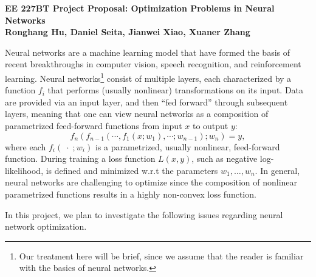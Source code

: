 \documentclass[10pt]{article}
\begin{document}
\parindent 0pt
\parskip 8pt

\begin{center}
\large\bf EE 227BT Project Proposal: Optimization Problems in Neural Networks \\
\large\bf \textnormal{Ronghang Hu, Daniel Seita, Jianwei Xiao, Xuaner Zhang} \\
\end{center}

Neural networks are a machine learning model that have formed the basis of recent breakthroughs in
computer vision, speech recognition, and reinforcement learning.  Neural networks\footnote{Our
treatment here will be brief, since we assume that the reader is familiar with the basics of neural
networks.} consist of multiple layers, each characterized by a function $f_i$ that performs (usually
nonlinear) transformations on its input. Data are provided via an input layer, and then ``fed
forward'' through subsequent layers, meaning that one can view neural networks as a composition of
parametrized feed-forward functions from input $x$ to output $y$:
\begin{equation}
f_n(f_{n-1}(\cdots, f_1(x; w_1), \cdots; w_{n-1}); w_n) = y,
\end{equation}
where each $f_i(\; \cdot \; ; w_i)$ is a parametrized, usually nonlinear, feed-forward function.
During training a loss function $L(x, y)$, such as negative log-likelihood, is defined and
minimized w.r.t the parameters $w_1,\ldots,w_n$.  In general, neural networks are challenging to
optimize since the composition of nonlinear parametrized functions results in a highly non-convex
loss function.

In this project, we plan to investigate the following issues regarding neural network optimization.
\end{document}
